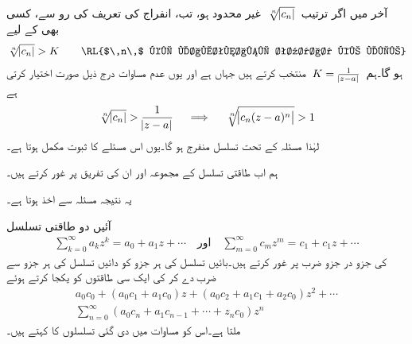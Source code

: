 آخر میں اگر ترتیب 
$\,\sqrt[\leftroot{-2}n]{\abs{c_n}}\,$
غیر محدود ہو، تب، انفراج کی تعریف کی رو سے، کسی بھی  کے لیے
\begin{align*}
\sqrt[\leftroot{-2}n]{\abs{c_n}}>K\quad\quad \text{\RL{$\,n\,$ کی لامتناہی تعداد کے لیے}}
\end{align*}
ہو گا۔ہم 
$\,K=\tfrac{1}{\abs{z-a}}\,$
منتخب کرتے ہیں جہاں  ہے اور یوں عدم مساوات درج ذیل صورت اختیار کرتی ہے
\begin{align*}
\sqrt[\leftroot{-2}n]{\abs{c_n}}>\frac{1}{\abs{z-a}} \quad \implies \quad \sqrt[\leftroot{-2}n]{\abs{c_n(z-a)^n}}>1
\end{align*}
لہٰذا مسئلہ  کے تحت تسلسل منفرج ہو گا۔یوں اس مسئلے کا ثبوت مکمل ہوتا ہے۔

ہم اب طاقتی تسلسل کے مجموعہ اور ان کی تفریق پر غور کرتے ہیں۔

  یہ نتیجہ مسئلہ  سے اخذ ہوتا ہے۔

آئیں دو طاقتی تسلسل 
\begin{align}\label{مساوات_ٹیلر_کوشی_حاصل_ضرب_الف}
\sum_{k=0}^{\infty} a_kz^k=a_0+a_1z+\cdots\quad \text{اور}\quad \sum_{m=0}^{\infty}c_mz^m=c_1+c_1z+\cdots
\end{align}
کی جزو در جزو ضرب پر غور کرتے ہیں۔بائیں تسلسل کی ہر جزو کو دائیں تسلسل  کی ہر جزو سے ضرب دے کر  کی ایک سی طاقتوں کو یکجا کرتے ہوئے
\begin{multline}\label{مساوات_ٹیلر_کوشی_حاصل_ضرب_ب}
a_0c_0+(a_0c_1+a_1c_0)z+(a_0c_2+a_1c_1+a_2c_0)z^2+\cdots\\
\sum\limits_{n=0}^{\infty} (a_0c_n+a_1c_{n-1}+\cdots+z_nc_0)z^n
\end{multline}
ملتا ہے۔اس کو مساوات  میں دی گئی تسلسلوں  کا  کہتے ہیں۔

